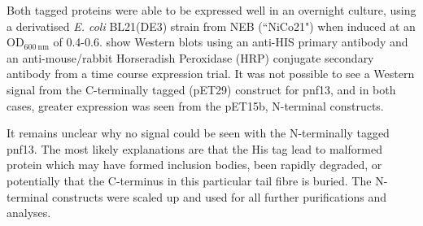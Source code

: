 Both tagged proteins were able to be expressed well in an overnight culture, using a derivatised \emph{E. coli} BL21(DE3) strain from NEB (``NiCo21") when induced at an OD$_{\mathrm{600\ nm}}$ of 0.4-0.6.  show Western blots using an anti-HIS primary antibody and an anti-mouse/rabbit Horseradish Peroxidase (HRP) conjugate secondary antibody from a time course expression trial. It was not possible to see a Western signal from the C-terminally tagged (pET29) construct for pnf13, and in both cases, greater expression was seen from the pET15b, N-terminal constructs.

It remains unclear why no signal could be seen with the N-terminally tagged pnf13. The most likely explanations are that the His tag lead to malformed protein which may have formed inclusion bodies, been rapidly degraded, or potentially that the C-terminus in this particular tail fibre is buried. The N-terminal constructs were scaled up and used for all further purifications and analyses.


